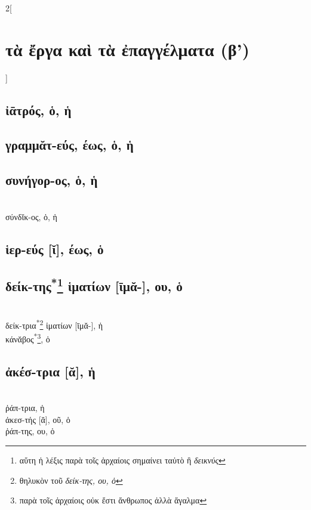 \documentclass{book}
\begin{document}
\begin{multicols}{2}[\section{τὰ ἔργα καὶ τὰ ἐπαγγέλματα (β')}]
\subsection{ἰᾱτρός, ὁ, ἡ} 
\subsection{γραμμᾰτ-εύς, έως, ὁ, ἡ}
\subsection{συνήγορ-ος, ὁ, ἡ}  ~\\
σύνδῐκ-ος, ὁ, ἡ 
\subsection{ἱερ-εύς [ῐ], έως, ὁ}
\subsection{δείκ-της\textsuperscript{*}\protect\footnote{αὕτη ἡ λέξις παρὰ τοῖς ἀρχαίοις σημαίνει ταὐτὸ ἢ \emph{δεικνύς}} ἱματίων [ῑμᾰ-], ου, ὁ}
 ~\\
{δείκ-τρια\textsuperscript{*}\footnote{θηλυκὸν τοῦ \emph{δείκ-της, ου, ὁ}} ἱματίων [ῑμᾰ-], ἡ}
 ~\\
κάνᾰβος\textsuperscript{*}\footnote{παρὰ τοῖς ἀρχαίοις οὐκ ἔστι ἄνθρωπος ἀλλὰ ἅγαλμα}, ὁ
\subsection{ἀκέσ-τρια [ᾰ], ἡ}  ~\\
ῥάπ-τρια, ἡ  ~\\
ἀκεσ-τής [ᾰ], οῦ, ὁ  ~\\
ῥάπ-της, ου, ὁ 

\end{multicols}
\end{document}
